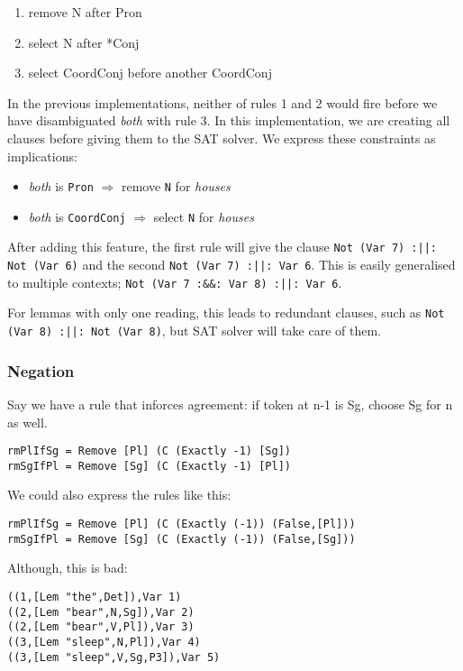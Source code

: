 \documentclass[a4paper, 11pt]{article}
\begin{document}
\begin{enumerate}
\item remove N after Pron
\item select N after *Conj
\item select CoordConj before another CoordConj
\end{enumerate}

In the previous implementations, neither of rules 1 and 2 would fire
before we have disambiguated \emph{both} with rule 3.
In this implementation, we are creating all clauses before giving
them to the SAT solver. We express these constraints as implications:
\begin{itemize}
\item \emph{both} is \texttt{Pron} $\Rightarrow$ remove \texttt{N} for \emph{houses}
\item \emph{both} is \texttt{CoordConj} $\Rightarrow$ select
  \texttt{N} for \emph{houses}
\end{itemize}

After adding this feature, the first rule will give the clause
\texttt{Not (Var 7) :||: Not (Var 6)} and the second \texttt{Not (Var
  7) :||: Var 6}.
This is easily generalised to multiple contexts; \texttt{Not (Var
  7 :&&: Var 8) :||: Var 6}.

For lemmas with only one reading, this leads to redundant clauses,
such as \texttt{Not (Var 8) :||: Not (Var 8)}, but SAT solver will
take care of them.

\subsubsection{Negation}

Say we have a rule that inforces agreement: if token at n-1 is Sg,
choose Sg for n as well.

\begin{lstlisting}
rmPlIfSg = Remove [Pl] (C (Exactly -1) [Sg])
rmSgIfPl = Remove [Sg] (C (Exactly -1) [Pl])
\end{lstlisting}

We could also express the rules like this:
\begin{lstlisting}
rmPlIfSg = Remove [Pl] (C (Exactly (-1)) (False,[Pl]))
rmSgIfPl = Remove [Sg] (C (Exactly (-1)) (False,[Sg]))
\end{lstlisting}

Although, this is bad: 
\begin{lstlisting}
((1,[Lem "the",Det]),Var 1)
((2,[Lem "bear",N,Sg]),Var 2)
((2,[Lem "bear",V,Pl]),Var 3)
((3,[Lem "sleep",N,Pl]),Var 4)
((3,[Lem "sleep",V,Sg,P3]),Var 5)
\end{lstlisting}
\end{document}
